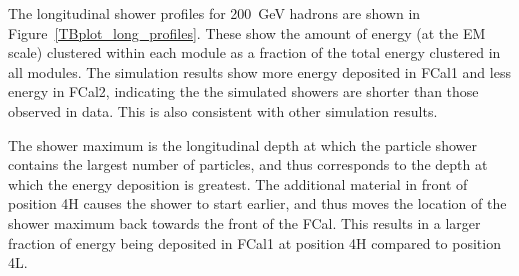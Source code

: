 %

The longitudinal shower profiles for 200~GeV hadrons are shown in Figure~\ref{TBplot_long_profiles}. These show the amount of energy (at the EM scale) clustered within each module as a fraction of the total energy clustered in all modules. The simulation  results show more energy deposited in FCal1 and less energy in FCal2, indicating the the simulated showers are shorter than those observed in data. This is also consistent with other \atlas simulation results\cite{calpub2010}.

The shower maximum is the longitudinal depth at which the particle shower contains the largest number of particles, and thus corresponds to the depth at which the energy deposition is greatest. The additional material in front of position 4H causes the shower to start earlier, and thus moves the location of the shower maximum back towards the front of the FCal. This results in a larger fraction of energy being deposited in FCal1 at position 4H compared to position 4L.


